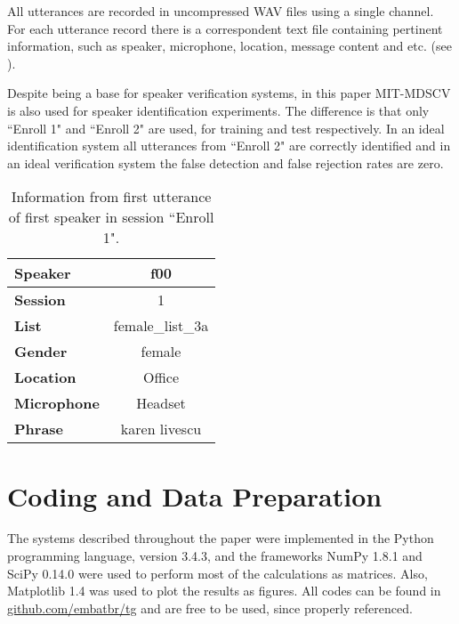 All utterances are recorded in uncompressed WAV files using a single channel. For each utterance record there is a correspondent text file containing pertinent information, such as speaker, microphone, location, message content and etc. (see ).

Despite being a base for speaker verification systems, in this paper MIT-MDSCV is also used for speaker identification experiments. The difference is that only ``Enroll 1" and ``Enroll 2" are used, for training and test respectively. In an ideal identification system all utterances from ``Enroll 2" are correctly identified and in an ideal verification system the false detection and false rejection rates are zero.

\begin{table}[h]
    \centering
    \begin{tabular}{|l|c|}
    \hline
    {\bf Speaker}    & f00              \\ \hline
    {\bf Session}    & 1                \\ \hline
    {\bf List}       & female\_list\_3a \\ \hline
    {\bf Gender}     & female           \\ \hline
    {\bf Location}   & Office           \\ \hline
    {\bf Microphone} & Headset          \\ \hline
    {\bf Phrase}     & karen livescu    \\ \hline
    \end{tabular}
    \caption{Information from first utterance of first speaker in session ``Enroll 1".}
    \label{tab:utterance-info}
\end{table}

\section{Coding and Data Preparation}
\label{sec:coding-and-data-preparation}

The systems described throughout the paper were implemented in the Python programming language, version 3.4.3, and the frameworks NumPy 1.8.1 and SciPy 0.14.0 were used to perform most of the calculations as matrices. Also, Matplotlib 1.4 was used to plot the results as figures. All codes can be found in \url{github.com/embatbr/tg} and are free to be used, since properly referenced.

